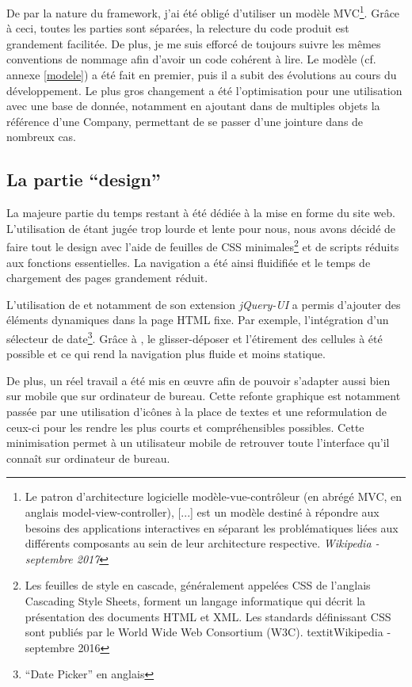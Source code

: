 \documentclass[a4paper, 11pt]{report}
\begin{document}
    De par la nature du framework, j'ai été obligé d'utiliser un modèle MVC\footnote{Le patron d'architecture logicielle modèle-vue-contrôleur (en abrégé MVC, en anglais model-view-controller), [...] est un modèle destiné à répondre aux besoins des applications interactives en séparant les problématiques liées aux différents composants au sein de leur architecture respective. \textit{Wikipedia - septembre 2017}}. Grâce à ceci, toutes les parties sont séparées, la relecture du code produit est grandement facilitée. De plus, je me suis efforcé de toujours suivre les mêmes conventions de nommage afin d'avoir un code cohérent à lire. Le modèle (cf. annexe \ref{modele}) a été fait en premier, puis il a subit des évolutions au cours du développement. Le plus gros changement a été l'optimisation pour une utilisation avec une base de donnée, notamment en ajoutant dans de multiples objets la référence d'une Company, permettant de se passer d'une jointure dans de nombreux cas.

    \subsection{La partie ``design''}
    La majeure partie du temps restant à été dédiée à la mise en forme du site web. L'utilisation de \bootstrap\cite{bootstrap} étant jugée trop lourde et lente pour nous, nous avons décidé de faire tout le design avec l'aide de feuilles de CSS minimales\footnote{Les feuilles de style en cascade, généralement appelées CSS de l'anglais Cascading Style Sheets, forment un langage informatique qui décrit la présentation des documents HTML et XML. Les standards définissant CSS sont publiés par le World Wide Web Consortium (W3C). textit{Wikipedia - septembre 2016}} et de scripts \js\cite{js} réduits aux fonctions essentielles. La navigation a été ainsi fluidifiée et le temps de chargement des pages grandement réduit.

    L'utilisation de \jq\cite{jquery} et notamment de son extension \textit{jQuery-UI} a permis d'ajouter des éléments dynamiques dans la page HTML fixe. Par exemple, l'intégration d'un sélecteur de date\footnote{``Date Picker'' en anglais}. Grâce à \jq, le glisser-déposer et l'étirement des cellules à été possible et ce qui rend la navigation plus fluide et moins statique.

    De plus, un réel travail a été mis en œuvre afin de pouvoir s'adapter aussi bien sur mobile que sur ordinateur de bureau. Cette refonte graphique est notamment passée par une utilisation d’icônes à la place de textes et une reformulation de ceux-ci pour les rendre les plus courts et compréhensibles possibles. Cette minimisation permet à un utilisateur mobile de retrouver toute l'interface qu'il connaît sur ordinateur de bureau.
\end{document}
